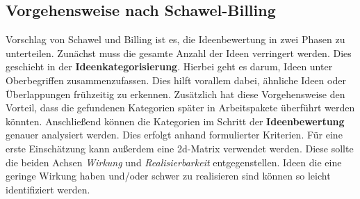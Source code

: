 \subsection{Vorgehensweise nach Schawel-Billing}
Vorschlag von Schawel und Billing ist es, die Ideenbewertung in zwei Phasen zu unterteilen. Zunächst muss die gesamte Anzahl 
der Ideen verringert werden. Dies geschieht in der \textbf{Ideenkategorisierung}. Hierbei geht es darum, Ideen unter 
Oberbegriffen zusammenzufassen. Dies hilft vorallem dabei, ähnliche Ideen oder Überlappungen frühzeitig zu erkennen.
Zusätzlich hat diese Vorgehensweise den Vorteil, dass die gefundenen Kategorien später in Arbeitspakete überführt werden 
könnten. Anschließend können die Kategorien im Schritt der \textbf{Ideenbewertung} genauer analysiert werden. 
Dies erfolgt anhand formulierter Kriterien. Für eine erste Einschätzung kann außerdem eine \ac{2d}-Matrix verwendet werden. 
Diese sollte die beiden Achsen \textit{Wirkung} und \textit{Realisierbarkeit} entgegenstellen. Ideen die eine geringe Wirkung haben und/oder 
schwer zu realisieren sind können so leicht identifiziert werden. \cite{schawel:2009}